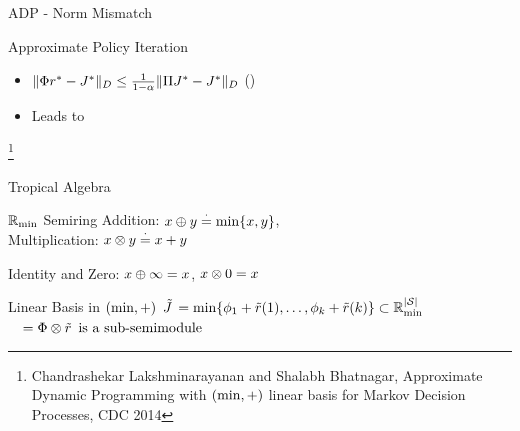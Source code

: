 \documentclass[10pt]{beamer}
\begin{document}
\begin{frame}[fragile]{ADP  - Norm Mismatch}

\begin{algorithm}[H]
\caption*{Approximate Policy Iteration {}}
\begin{algorithmic}[1]
\STATE{\}}
\end{algorithmic}
\end{algorithm}

\begin{itemize}
\item {{$\|\Phi r^*-J^*\|_D\leq \frac{1}{1-\alpha}\|\Pi J^*-J^*\|_D$}} ({\color{orange}{Norm Mismatch}})
\item Leads to {\color{orange}{policy oscillations}}
\end{itemize}
\end{frame}






\begin{frame}[fragile]{}

\begin{block}{}
\centering {\Large\color{teal}{ADP in Tropical Algebra}}\footnote{Chandrashekar Lakshminarayanan and Shalabh Bhatnagar, Approximate Dynamic Programming with $(\min,+)$ linear basis for Markov Decision Processes, CDC 2014}
\end{block}



\end{frame}

\begin{frame}[fragile]{Tropical Algebra}

\begin{block}{$\mathbb{R}_{\min}$ Semiring}
Addition: {{$x\oplus y\stackrel{\cdot}{=}\min\{x,y\}$}},\\
Multiplication: {{$x\otimes y\stackrel{\cdot}{=} x+y$}}
\end{block}

{Identity and Zero}: {{$x\oplus \infty=x$, $x\otimes 0 =x$}}
\p
\begin{block}{Linear Basis in $(\min,+)$ }
$\tilde{J}\,=\min\{\phi_{1}+\tilde{r}(1),\ldots,\phi_{k}+\tilde{r}(k)\}\subset \mathbb{R}_{\min}^{|\mathcal{S}|}$\\
$\quad=\Phi \otimes \tilde{r} \,\text{~is~a~sub-semimodule}$

\end{block}

\end{frame}
\end{document}
